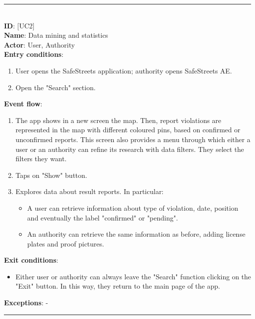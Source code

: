 \documentclass{article}
\newcommand\usecase[1]{ [UC#1] }
\begin{document}
				\rule{\linewidth}{0.4pt}
				\\
				
				\textbf{ID}: \usecase{2} \\
				\textbf{Name}:   Data mining and statistics\\
				\textbf{Actor}:  User, Authority\\
				\textbf{Entry conditions}:
				\begin{enumerate}
					\item User opens the SafeStreets application; authority opens SafeStreets AE.
					\item Open the "Search" section.
				\end{enumerate}
				\textbf{Event flow}:
				\begin{enumerate}
					\item The app shows in a new screen the map. Then, report violations are represented in the map with different coloured pins, based on confirmed or unconfirmed reports. This screen also provides a menu through which either a user or an authority can refine its research with data filters.
					They select the filters they want.
					\item Taps on "Show" button.
					\item Explores data about result reports. In particular:
					\begin{itemize}
						\item A user can retrieve information about type of violation, date, position and eventually the label "confirmed" or "pending".
						\item An authority can retrieve the same information as before, adding license plates and proof pictures.
					\end{itemize}
				\end{enumerate}
				\textbf{Exit conditions}:
				\begin{itemize}
					\item Either user or authority can always leave the "Search" function clicking on the "Exit" button. In this way, they return to the main page of the app.
				\end{itemize}
				\textbf{Exceptions}: -\\
				
				\rule{\linewidth}{0.4pt}
				\\
					
\end{document}
